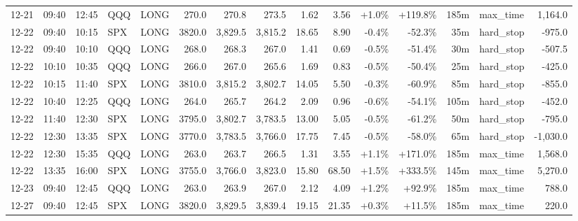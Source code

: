 \documentclass[11pt,a4paper,twoside]{article}
\begin{document}
\begin{landscape}
\begin{center}
\begin{longtable}{>{\color{txtmain}}l l l l l r r r r r r r r >{\color{txtmain}}l r}
12-21 & 09:40 & 12:45 & QQQ & LONG & 270.0 & 270.8 & 273.5 & 1.62 & 3.56 & \textcolor{wingreen}{+1.0\%} & \textcolor{wingreen}{+119.8\%} & 185m & max\_time & \textcolor{wingreen}{1,164.0} \\
12-22 & 09:40 & 10:15 & SPX & LONG & 3820.0 & 3,829.5 & 3,815.2 & 18.65 & 8.90 & \textcolor{lossred}{-0.4\%} & \textcolor{lossred}{-52.3\%} & 35m & hard\_stop & \textcolor{lossred}{-975.0} \\
12-22 & 09:40 & 10:10 & QQQ & LONG & 268.0 & 268.3 & 267.0 & 1.41 & 0.69 & \textcolor{lossred}{-0.5\%} & \textcolor{lossred}{-51.4\%} & 30m & hard\_stop & \textcolor{lossred}{-507.5} \\
12-22 & 10:10 & 10:35 & QQQ & LONG & 266.0 & 267.0 & 265.6 & 1.69 & 0.83 & \textcolor{lossred}{-0.5\%} & \textcolor{lossred}{-50.4\%} & 25m & hard\_stop & \textcolor{lossred}{-425.0} \\
12-22 & 10:15 & 11:40 & SPX & LONG & 3810.0 & 3,815.2 & 3,802.7 & 14.05 & 5.50 & \textcolor{lossred}{-0.3\%} & \textcolor{lossred}{-60.9\%} & 85m & hard\_stop & \textcolor{lossred}{-855.0} \\
12-22 & 10:40 & 12:25 & QQQ & LONG & 264.0 & 265.7 & 264.2 & 2.09 & 0.96 & \textcolor{lossred}{-0.6\%} & \textcolor{lossred}{-54.1\%} & 105m & hard\_stop & \textcolor{lossred}{-452.0} \\
12-22 & 11:40 & 12:30 & SPX & LONG & 3795.0 & 3,802.7 & 3,783.5 & 13.00 & 5.05 & \textcolor{lossred}{-0.5\%} & \textcolor{lossred}{-61.2\%} & 50m & hard\_stop & \textcolor{lossred}{-795.0} \\
12-22 & 12:30 & 13:35 & SPX & LONG & 3770.0 & 3,783.5 & 3,766.0 & 17.75 & 7.45 & \textcolor{lossred}{-0.5\%} & \textcolor{lossred}{-58.0\%} & 65m & hard\_stop & \textcolor{lossred}{-1,030.0} \\
12-22 & 12:30 & 15:35 & QQQ & LONG & 263.0 & 263.7 & 266.5 & 1.31 & 3.55 & \textcolor{wingreen}{+1.1\%} & \textcolor{wingreen}{+171.0\%} & 185m & max\_time & \textcolor{wingreen}{1,568.0} \\
12-22 & 13:35 & 16:00 & SPX & LONG & 3755.0 & 3,766.0 & 3,823.0 & 15.80 & 68.50 & \textcolor{wingreen}{+1.5\%} & \textcolor{wingreen}{+333.5\%} & 145m & max\_time & \textcolor{wingreen}{5,270.0} \\
12-23 & 09:40 & 12:45 & QQQ & LONG & 263.0 & 263.9 & 267.0 & 2.12 & 4.09 & \textcolor{wingreen}{+1.2\%} & \textcolor{wingreen}{+92.9\%} & 185m & max\_time & \textcolor{wingreen}{788.0} \\
12-27 & 09:40 & 12:45 & SPX & LONG & 3820.0 & 3,829.5 & 3,839.4 & 19.15 & 21.35 & \textcolor{wingreen}{+0.3\%} & \textcolor{wingreen}{+11.5\%} & 185m & max\_time & \textcolor{wingreen}{220.0} \\

\end{longtable}
\end{center}
\end{landscape}
\end{document}
